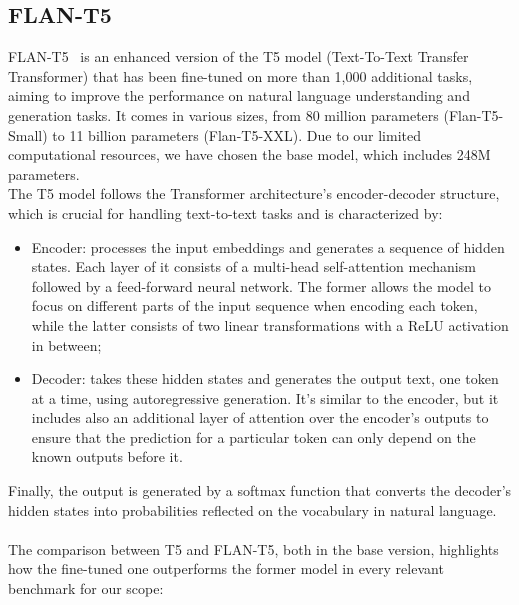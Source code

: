 \documentclass[10pt,twocolumn,letterpaper]{article}
\begin{document}
\subsection{FLAN-T5}

FLAN-T5~\cite{chung2022scalinginstructionfinetunedlanguagemodels} is an enhanced version of the T5 model (Text-To-Text Transfer Transformer) that has been fine-tuned on more than 1,000 additional tasks, aiming to improve the performance on natural language understanding and generation tasks. It comes in various sizes, from 80 million parameters (Flan-T5-Small) to 11 billion parameters (Flan-T5-XXL). Due to our limited computational resources, we have chosen the base model, which includes 248M parameters.\\
The T5 model follows the Transformer architecture’s encoder-decoder structure, which is crucial for handling text-to-text tasks and is characterized by:
\begin{itemize}
    \item Encoder: processes the input embeddings and generates a sequence of hidden states. Each layer of it consists of a multi-head self-attention mechanism followed by a feed-forward neural network. The former allows the model to focus on different parts of the input sequence when encoding each token, while the latter consists of two linear transformations with a ReLU activation in between;
    \item Decoder: takes these hidden states and generates the output text, one token at a time, using autoregressive generation. It's similar to the encoder, but it includes also an additional layer of attention over the encoder’s outputs to ensure that the prediction for a particular token can only depend on the known outputs before it.
\end{itemize}
Finally, the output is generated by a softmax function that converts the decoder's hidden states into probabilities reflected on the vocabulary in natural language. \\ \\
The comparison between T5 and FLAN-T5, both in the base version, highlights how the fine-tuned one outperforms the former model in every relevant benchmark for our scope: 
\end{document}
